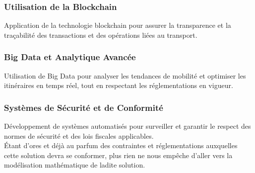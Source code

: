 \subsubsection*{Utilisation de la Blockchain}
Application de la technologie blockchain pour assurer la transparence et la traçabilité des transactions et des opérations liées au transport.

\subsubsection*{Big Data et Analytique Avancée}
Utilisation de Big Data pour analyser les tendances de mobilité et optimiser les itinéraires en temps réel, tout en respectant les réglementations en vigueur.

\subsubsection*{Systèmes de Sécurité et de Conformité}
Développement de systèmes automatisés pour surveiller et garantir le respect des normes de sécurité et des lois fiscales applicables.
\\
Étant d'ores et déjà au parfum des contraintes et réglementations auxquelles cette solution devra se conformer, plus rien ne nous empêche d'aller vers la modélisation mathématique de ladite solution.



